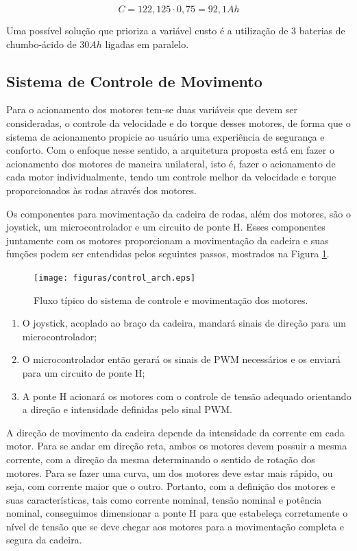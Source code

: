 \begin{equation}
C = 122,125 \cdot 0,75 = 92,1Ah
\end{equation}

Uma possível solução que prioriza a variável custo é a utilização de $3$ baterias
de chumbo-ácido de $30 Ah$ ligadas em paralelo.

\subsection{Sistema de Controle de Movimento}
Para o acionamento dos motores tem-se duas variáveis que devem 
ser consideradas, o controle da velocidade e do torque desses 
motores, de forma que o sistema de acionamento propicie ao usuário 
uma experiência de segurança e conforto. Com o enfoque nesse sentido, 
a arquitetura proposta está em fazer o acionamento dos motores de 
maneira unilateral, isto é, fazer o acionamento de cada motor 
individualmente, tendo um controle melhor da velocidade e torque 
proporcionados às rodas através dos motores.

Os componentes para movimentação da cadeira de rodas, além 
dos motores, são o joystick, um microcontrolador e um circuito 
de ponte H. Esses componentes juntamente com os motores proporcionam 
a movimentação da cadeira e suas funções podem ser entendidas 
pelos seguintes passos, mostrados na Figura \ref{fig:control_arch}.

\begin{figure}[H]
  \centering
    \texttt{[image: figuras/control\_arch.eps]}
  \caption{Fluxo típico do sistema de controle e movimentação dos motores.}
  \label{fig:control_arch}
\end{figure}

\begin{enumerate}
\item O  joystick, acoplado ao braço da cadeira, 
mandará sinais de direção para um microcontrolador;
\item O microcontrolador então gerará os sinais de 
PWM necessários e os enviará para um circuito de ponte H;
\item A ponte H acionará os motores com o controle de 
tensão adequado orientando a direção e intensidade definidas pelo sinal PWM.
\end{enumerate}

A direção de movimento da cadeira depende da intensidade 
da corrente em cada motor. Para se andar em direção reta, 
ambos os motores devem possuir a mesma corrente, com a direção 
da mesma determinando o sentido de rotação dos motores. Para se 
fazer uma curva, um dos motores deve estar mais rápido, ou seja, 
com corrente maior que o outro. Portanto, com a definição 
dos motores e suas características, tais como corrente nominal, 
tensão nominal e potência nominal, conseguimos dimensionar 
a ponte H para que estabeleça corretamente o nível de tensão que 
se deve chegar aos motores para a movimentação completa e segura da cadeira.

